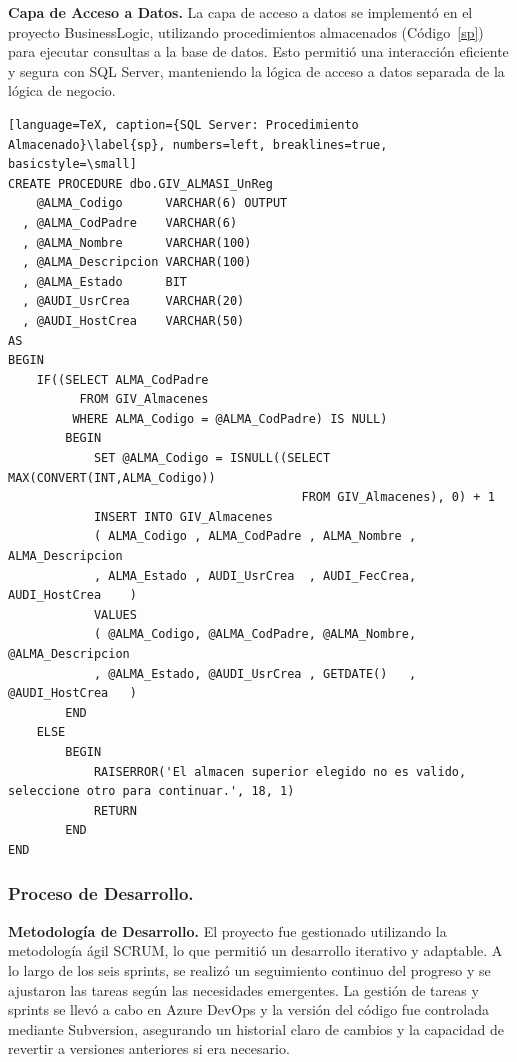 \documentclass[stu, 12pt, letterpaper, donotrepeattitle, floatsintext, natbib]{apa7}
\begin{document}
\textbf{Capa de Acceso a Datos. }La capa de acceso a datos se implementó en el proyecto BusinessLogic, utilizando procedimientos almacenados
(Código~\ref{sp}) para ejecutar consultas a la base de datos. Esto permitió una interacción eficiente y segura con SQL Server, manteniendo la
lógica de acceso a datos separada de la lógica de negocio.
\begin{lstlisting}[language=TeX, caption={SQL Server: Procedimiento Almacenado}\label{sp}, numbers=left, breaklines=true, basicstyle=\small]
CREATE PROCEDURE dbo.GIV_ALMASI_UnReg 
    @ALMA_Codigo      VARCHAR(6) OUTPUT
  , @ALMA_CodPadre    VARCHAR(6)
  , @ALMA_Nombre      VARCHAR(100)
  , @ALMA_Descripcion VARCHAR(100)
  , @ALMA_Estado      BIT
  , @AUDI_UsrCrea     VARCHAR(20)
  , @AUDI_HostCrea    VARCHAR(50)  
AS  
BEGIN
    IF((SELECT ALMA_CodPadre 
          FROM GIV_Almacenes  
         WHERE ALMA_Codigo = @ALMA_CodPadre) IS NULL)  
        BEGIN  
            SET @ALMA_Codigo = ISNULL((SELECT MAX(CONVERT(INT,ALMA_Codigo))  
                                         FROM GIV_Almacenes), 0) + 1
            INSERT INTO GIV_Almacenes  
            ( ALMA_Codigo , ALMA_CodPadre , ALMA_Nombre , ALMA_Descripcion     
            , ALMA_Estado , AUDI_UsrCrea  , AUDI_FecCrea, AUDI_HostCrea    )  
            VALUES  
            ( @ALMA_Codigo, @ALMA_CodPadre, @ALMA_Nombre, @ALMA_Descripcion     
            , @ALMA_Estado, @AUDI_UsrCrea , GETDATE()   , @AUDI_HostCrea   )  
        END
    ELSE  
        BEGIN  
            RAISERROR('El almacen superior elegido no es valido, seleccione otro para continuar.', 18, 1)  
            RETURN  
        END  
END
\end{lstlisting}
\subsubsection{Proceso de Desarrollo.}
\textbf{Metodología de Desarrollo. }El proyecto fue gestionado utilizando la metodología ágil SCRUM, lo que permitió un desarrollo iterativo y
adaptable. A lo largo de los seis sprints, se realizó un seguimiento continuo del progreso y se ajustaron las tareas según las necesidades
emergentes. La gestión de tareas y sprints se llevó a cabo en Azure DevOps y la versión del código fue controlada mediante Subversion,
asegurando un historial claro de cambios y la capacidad de revertir a versiones anteriores si era necesario.
\end{document}
